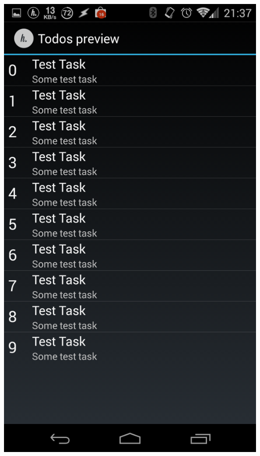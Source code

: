 \begin{minipage}[t]{0.45\textwidth}
\centering
	\includegraphics[width = \linewidth]{img/android/lib_task_list}
	\label{fig:lib_task_list}
\end{minipage}

